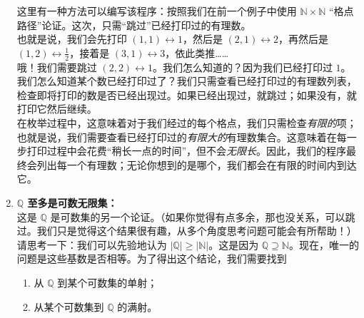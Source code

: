 \begin{example}
\begin{enumerate}[label=(\arabic*)]
              这里有一种方法可以编写该程序：按照我们在前一个例子中使用 $\mathbb{N} \times \mathbb{N}$ ``格点路径''论证。这次，只需``跳过''已经打印过的有理数。\\

              也就是说，我们会先打印 $(1, 1) \leftrightarrow 1$，然后是 $(2, 1) \leftrightarrow 2$，再然后是 $(1, 2) \leftrightarrow \frac{1}{2}$，接着是 $(3, 1) \leftrightarrow 3$，依此类推……\\

              哦！我们需要跳过 $(2, 2) \leftrightarrow 1$。我们怎么知道的？因为我们已经打印过 $1$。我们怎么知道某个数已经打印过了？我们只需查看已经打印过的有理数列表，检查即将打印的数是否已经出现过。如果已经出现过，就跳过；如果没有，就打印它然后继续。\\

              在枚举过程中，这意味着对于我们经过的每个格点，我们只需检查\emph{有限的}项；也就是说，我们需要查看已经打印过的\emph{有限大的}有理数集合。这意味着在每一步打印过程中会花费``稍长一点的时间''，但不会\emph{无限长}。因此，我们的程序最终会列出每一个有理数；无论你想到的是哪个，我们都会在有限的时间内到达它。\\
        \item \textbf{$\mathbb{Q}$ 至多是可数无限集：}\\
              这是 $\mathbb{Q}$ 是可数集的另一个论证。（如果你觉得有点多余，那也没关系，可以跳过。我们只是觉得这个结果很有趣，从多个角度思考问题可能会有所帮助！）\\

              请思考一下：我们可以先验地认为 $|\mathbb{Q}| \ge |\mathbb{N}|$。这是因为 $\mathbb{Q} \supseteq \mathbb{N}$。现在，唯一的问题是这些基数是否相等。为了得出这个结论，我们需要找到
              \begin{enumerate}[label=(\alph*)]
                  \item 从 $\mathbb{Q}$ 到某个可数集的单射；
                  \item 从某个可数集到 $\mathbb{Q}$ 的满射。\\
              \end{enumerate}


\end{enumerate}
\end{example}
